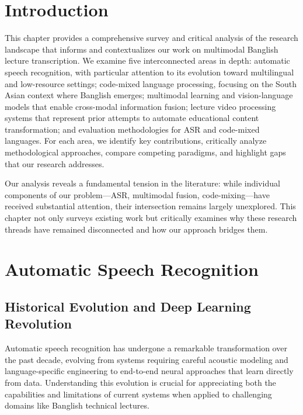 
\section{Introduction}

This chapter provides a comprehensive survey and critical analysis of the research landscape that informs and contextualizes our work on multimodal Banglish lecture transcription. We examine five interconnected areas in depth: automatic speech recognition, with particular attention to its evolution toward multilingual and low-resource settings; code-mixed language processing, focusing on the South Asian context where Banglish emerges; multimodal learning and vision-language models that enable cross-modal information fusion; lecture video processing systems that represent prior attempts to automate educational content transformation; and evaluation methodologies for ASR and code-mixed languages. For each area, we identify key contributions, critically analyze methodological approaches, compare competing paradigms, and highlight gaps that our research addresses.

Our analysis reveals a fundamental tension in the literature: while individual components of our problem---ASR, multimodal fusion, code-mixing---have received substantial attention, their intersection remains largely unexplored. This chapter not only surveys existing work but critically examines why these research threads have remained disconnected and how our approach bridges them.

\section{Automatic Speech Recognition}

\subsection{Historical Evolution and Deep Learning Revolution}

Automatic speech recognition has undergone a remarkable transformation over the past decade, evolving from systems requiring careful acoustic modeling and language-specific engineering to end-to-end neural approaches that learn directly from data. Understanding this evolution is crucial for appreciating both the capabilities and limitations of current systems when applied to challenging domains like Banglish technical lectures.


